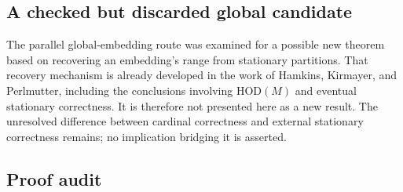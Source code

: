 \documentclass[11pt,letterpaper]{article}
\theoremstyle{definition}
\newcommand{\HOD}{\mathrm{HOD}}
\begin{document}
\subsection{A checked but discarded global candidate}

The parallel global-embedding route was examined for a possible new theorem based on recovering an embedding's range from stationary partitions. That recovery mechanism is already developed in the work of Hamkins, Kirmayer, and Perlmutter, including the conclusions involving $\HOD(M)$ and eventual stationary correctness.\cite{hkp} It is therefore not presented here as a new result. The unresolved difference between cardinal correctness and external stationary correctness remains; no implication bridging it is asserted.

\subsection{Proof audit}
\end{document}
